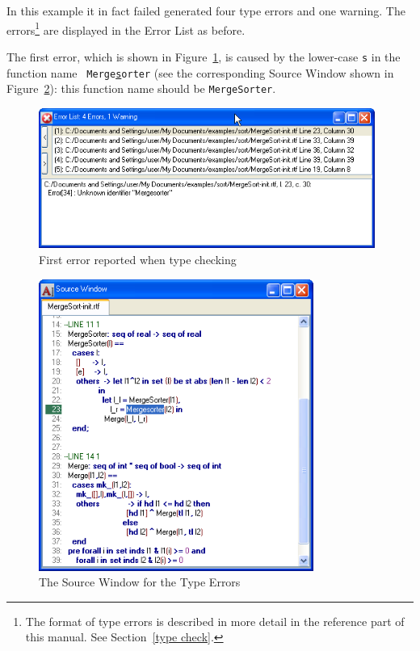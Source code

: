 \documentclass[\pformat,12pt]{article}
\newcommand{\guicmd}[1]{{\sf #1}}
\begin{document}
In this example it in fact failed 
generated four type errors and one warning. The errors\footnote{The
  format of type errors is described in more detail in the reference
  part of this manual. See Section~\ref{type check}.} are displayed in
the \guicmd{Error List} as before.

The first error, which is shown in Figure~\ref{fig:type_error1}, is
caused by the lower-case {\tt s} in the function name {\tt
  Merge\underline{s}orter} (see the corresponding \guicmd{Source Window} shown in
Figure~\ref{fig:source-type}): this function name should be {\tt MergeSorter}.


\begin{figure}[tbh]
\begin{center}
\includegraphics[width=11cm]{typeError1-ppENG.png}
\caption{First error reported when type checking}
\label{fig:type_error1}
\end{center}
\end{figure}

\begin{figure}[tbh]
\begin{center}
\includegraphics[width=9cm]{sourceWindow-type-ppENG.png}
\caption{The Source Window for the Type Errors}
\label{fig:source-type}
\end{center}
\end{figure}
\end{document}
